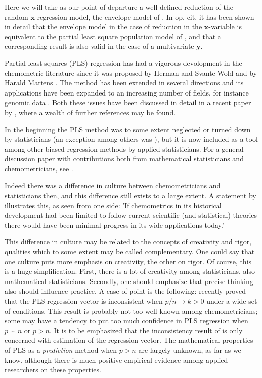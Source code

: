 \documentclass[a4paper, 11pt]{article}
\begin{document}
Here we will take as our point of departure a well defined reduction of the random $\bm{x}$ regression model, the envelope model of \citet{cook2013envelopes}. In op. cit. it has been shown in detail that the envelope model in the case of reduction in the $\bm{x}$-variable is equivalent to the partial least square population model of \citet{helland1990partial}, and that a corresponding result is also valid in the case of a multivariate $\bm{y}$.

Partial least squares (PLS) regression has had a vigorous devolopment in the chemometric literature since it was proposed by Herman and Svante Wold and by Harald Martens \citep{wold1984collinearity, martens1992multivariate}. The method has been extended in several directions and its applications have been expanded to an increasing number of fields, for instance genomic data \citep{boulesteix2007partial}. Both these issues have been discussed in detail in a recent paper by \citet{mehmood2016diversity}, where a wealth of further references may be found.

In the beginning the PLS method was to some extent neglected or turned down by statisticians (an exception among others was \citealp*{frank1993statistical}), but it is now included as a tool among other biased regression methods by applied statisticians. For a general discussion paper with contributions both from mathematical statisticians and chemometricians, see \citet{sundberg1999multivariate}.

Indeed there was a difference in culture between chemometricians and statisticians then, and this difference still exists to a large extent. A statement by \citet{munck2010physiochemical} illustrates this, as seen from one side: 'If chemometrics in its historical development had been limited to follow current scientific (and statistical) theories there would have been minimal progress in its wide applications today.'

This difference in culture may be related to the concepts of creativity and rigor, qualities which to some extent may be called complementary. One could say that one culture puts more emphasis on creativity, the other on rigor. Of course, this is a huge simplification. First, there is a lot of creativity among statisticians, also mathematical statisticians. Secondly, one should emphasize that precise thinking also should influence practice. A case of point is the following: \citet{chung2010sparse} recently proved that the PLS regression vector is inconsistent when $p/n\rightarrow k>0$ under a wide set of conditions. This result is probably not too well known among chemometricians; some may have a tendency to put too much confidence in PLS regression when $p\sim n$ or $p>n$. It is to be emphasized that the inconsistency result of \citet{chung2010sparse} is only concerned with estimation of the regression vector. The mathematical properties of PLS as a \emph{prediction} method when $p>n$ are largely unknown, as far as we know, although there is much positive empirical evidence among applied researchers on these properties.
\end{document}
